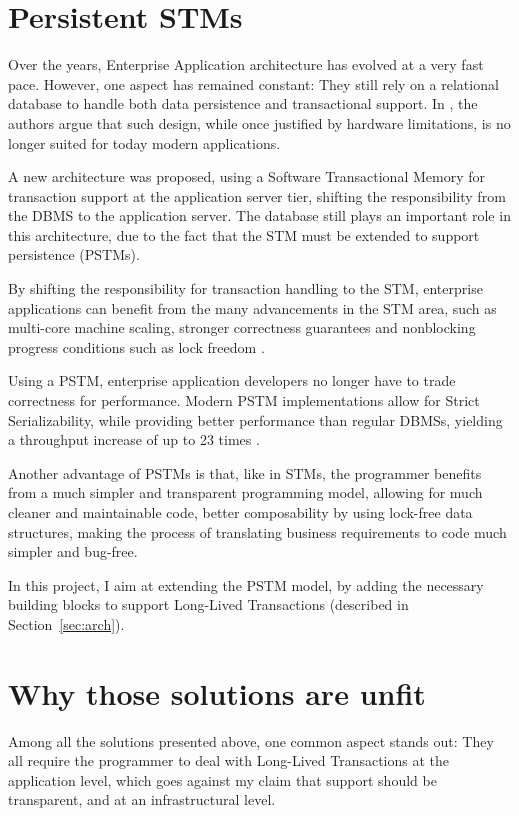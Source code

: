 \section{Persistent STMs}
\label{sec:pstm}

Over the years, Enterprise Application architecture has evolved at a
very fast pace. However, one aspect has remained constant: They still
rely on a relational database to handle both data persistence and
transactional support. In \cite{fernandes2011strict}, the authors
argue that such design, while once justified by hardware limitations,
is no longer suited for today modern applications.

A new architecture was proposed, using a Software Transactional Memory
for transaction support at the application server tier, shifting the
responsibility from the DBMS to the application server. The database
still plays an important role in this architecture, due to the fact
that the STM must be extended to support persistence (PSTMs).

By shifting the responsibility for transaction handling to the STM,
enterprise applications can benefit from the many advancements in the
STM area, such as multi-core machine scaling, stronger correctness
guarantees and nonblocking progress conditions such as lock freedom
\cite{fernandes2011lock}.

Using a PSTM, enterprise application developers no longer have to
trade correctness for performance. Modern PSTM implementations allow
for Strict Serializability, while providing better performance than
regular DBMSs, yielding a throughput increase of up to 23 times
\cite{fernandes2011strict}.

Another advantage of PSTMs is that, like in STMs, the programmer
benefits from a much simpler and transparent programming model,
allowing for much cleaner and maintainable code, better composability
by using lock-free data structures, making the process of translating
business requirements to code much simpler and bug-free.

In this project, I aim at extending the PSTM model, by adding the
necessary building blocks to support Long-Lived Transactions
(described in Section~\ref{sec:arch}).

\section{Why those solutions are unfit}

Among all the solutions presented above, one common aspect stands out:
They all require the programmer to deal with Long-Lived Transactions
at the application level, which goes against my claim that support
should be transparent, and at an infrastructural level.

